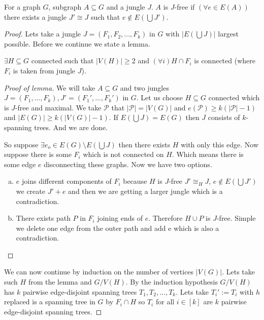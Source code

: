 \begin{defn}
	For a graph $G$, subgraph $A \subseteq G$ and a jungle $J$. $A$ is $J$-free if $(\forall e \in E(A))$ there exists a jungle $J' \cong J$ such that $e \notin E(\bigcup J')$. 
\end{defn}

\begin{proof}
	Lets take a jungle $J = (F_{1}, F_{2}, \dots, F_{k})$ in $G$ with $|E (\bigcup J)|$ largest possible. Before we continue we state a lemma.
	
	\begin{lemma}
		$\exists H \subseteq G$ connected such that $|V(H)| \geq 2$ and $(\forall i) H \cap F_{i}$ is connected (where $F_{i}$ is taken from jungle $J$).
	\end{lemma}
	
	\begin{proof}[Proof of lemma]
		We will take $A \subseteq G$ and two jungles $J = (F_{1}, \dots, F_{k}), J' = (F_{1}', \dots, F_{k}')$ in $G$. Let us choose $H \subseteq G$ connected which is $J$-free and maximal. We take $\mathcal{P}$ that $|\mathcal{P}| = |V(G)|$ and $e(\mathcal{P}) \geq k(|\mathcal{P}| - 1)$ and $|E(G)| \geq k (|V(G)| -1)$. If $E(\bigcup J) = E(G)$ then $J$ consists of $k$-spanning trees. And we are done.
		
		So suppose $\exists e_{o} \in E(G) \setminus E(\bigcup J)$ then there exists $H$ with only this edge. Now suppose there is some $F_{i}$ which is not connected on $H$. Which means there is some edge $e$ disconnecting these graphs. Now we have two options.
		
		\begin{enumerate}[(a)]
			\item $e$ joins different components of $F_{i}$ because $H$ is $J$-free $J' \cong_{H} J$, $e \notin E(\bigcup J')$ we create $J' + e$ and then we are getting a larger jungle which is a contradiction.
			
			\item There exists path $P$ in $F_{i}$ joining ends of $e$. Therefore $H \cup P$ is $J$-free. Simple we delete one edge from the outer path and add e which is also a contradiction.
		\end{enumerate}
	\end{proof}
	
	We can now continue by induction on the number of vertices $|V(G)|$. Lets take such $H$ from the lemma and $G / V(H)$. By the induction hypothesis $G / V(H)$ has $k$ pairwise edge-disjoint spanning trees $T_{1}, T_{2}, \dots, T_{k}$. Lets take $T_{i}' := T_{i}$ with $h$ replaced is a spanning tree in $G$ by $F_{i} \cap H$ so $T_{i}$ for all $i \in [k]$ are $k$ pairwise edge-disjoint spanning trees.
	
\end{proof}